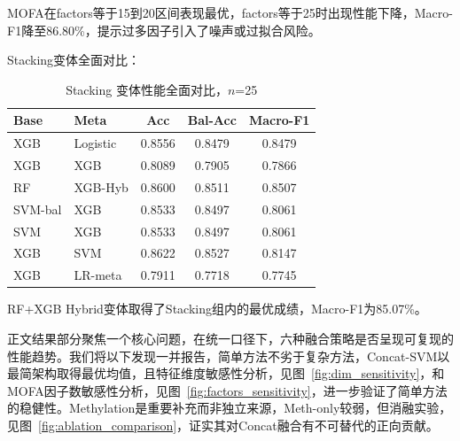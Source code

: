 MOFA在factors等于15到20区间表现最优，factors等于25时出现性能下降，Macro-F1降至86.80\%，提示过多因子引入了噪声或过拟合风险。

Stacking变体全面对比：

\begin{table}[H]
\centering
\small
\caption{Stacking 变体性能全面对比，$n$=25}
\label{tab:stacking-all}
\begin{tabular}{llccc}
\toprule
Base & Meta & Acc & Bal-Acc & Macro-F1 \\
\midrule
XGB & Logistic & 0.8556 & 0.8479 & 0.8479 \\
XGB & XGB & 0.8089 & 0.7905 & 0.7866 \\
RF & XGB-Hyb & 0.8600 & 0.8511 & 0.8507 \\
SVM-bal & XGB & 0.8533 & 0.8497 & 0.8061 \\
SVM & XGB & 0.8533 & 0.8497 & 0.8061 \\
XGB & SVM & 0.8622 & 0.8527 & 0.8147 \\
XGB & LR-meta & 0.7911 & 0.7718 & 0.7745 \\
\bottomrule
\end{tabular}
\end{table}

RF+XGB Hybrid变体取得了Stacking组内的最优成绩，Macro-F1为85.07\%。

正文结果部分聚焦一个核心问题，在统一口径下，六种融合策略是否呈现可复现的性能趋势。我们将以下发现一并报告，简单方法不劣于复杂方法，Concat-SVM以最简架构取得最优均值，且特征维度敏感性分析，见图~\ref{fig:dim_sensitivity}，和MOFA因子数敏感性分析，见图~\ref{fig:factors_sensitivity}，进一步验证了简单方法的稳健性。Methylation是重要补充而非独立来源，Meth-only较弱，但消融实验，见图~\ref{fig:ablation_comparison}，证实其对Concat融合有不可替代的正向贡献。
